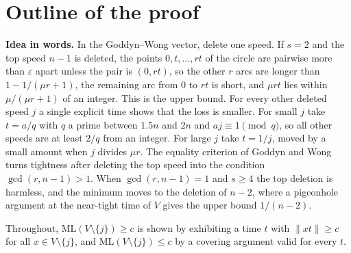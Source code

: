 \documentclass[11pt]{article}
\theoremstyle{remark}
\newcommand{\norm}[1]{\lVert #1\rVert}
\newcommand{\ML}{\mathrm{ML}}
\begin{document}
\section{Outline of the proof}\label{sec:outline}

\noindent\textbf{Idea in words.}
In the Goddyn--Wong vector, delete one speed. If $s=2$ and the top speed $n-1$ is deleted, the points $0,t,\dots,rt$ of the circle are pairwise more than $\varepsilon$ apart unless the pair is $(0,rt)$, so the other $r$ arcs are longer than $1-1/(\mu r+1)$, the remaining arc from $0$ to $rt$ is short, and $\mu rt$ lies within $\mu/(\mu r+1)$ of an integer. This is the upper bound. For every other deleted speed $j$ a single explicit time shows that the loss is smaller. For small $j$ take $t=a/q$ with $q$ a prime between $1.5n$ and $2n$ and $aj\equiv1\pmod q$, so all other speeds are at least $2/q$ from an integer. For large $j$ take $t=1/j$, moved by a small amount when $j$ divides $\mu r$. The equality criterion of Goddyn and Wong turns tightness after deleting the top speed into the condition $\gcd(r,n-1)>1$. When $\gcd(r,n-1)=1$ and $s\ge4$ the top deletion is harmless, and the minimum moves to the deletion of $n-2$, where a pigeonhole argument at the near-tight time of $V$ gives the upper bound $1/(n-2)$.


Throughout, $\ML(V\setminus\{j\})\ge c$ is shown by exhibiting a time $t$ with $\norm{xt}\ge c$ for all $x\in V\setminus\{j\}$, and $\ML(V\setminus\{j\})\le c$ by a covering argument valid for every $t$.
\end{document}
